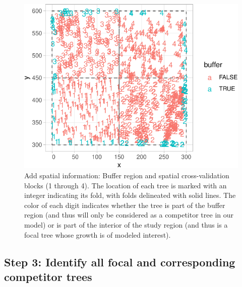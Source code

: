 \documentclass[12pt]{article}
\newenvironment{Shaded}{\begin{snugshade}}{\end{snugshade}}
\newcommand{\DataTypeTok}[1]{\textcolor[rgb]{0.13,0.29,0.53}{#1}}
\newcommand{\DecValTok}[1]{\textcolor[rgb]{0.00,0.00,0.81}{#1}}
\newcommand{\KeywordTok}[1]{\textcolor[rgb]{0.13,0.29,0.53}{\textbf{#1}}}
\newcommand{\NormalTok}[1]{#1}
\newcommand{\OperatorTok}[1]{\textcolor[rgb]{0.81,0.36,0.00}{\textbf{#1}}}
\newcommand{\StringTok}[1]{\textcolor[rgb]{0.31,0.60,0.02}{#1}}
\begin{document}
\begin{Shaded}
\end{Shaded}

\begin{figure}

{\centering \includegraphics[width=0.66\linewidth]{Figures/scbi-spatial-information-1} 

}

\caption{Add spatial information: Buffer region and spatial cross-validation blocks (1 through 4). The location of each tree is marked with an integer indicating its fold, with folds delineated with solid lines. The color of each digit indicates whether the tree is part of the buffer region (and thus will only be considered as a competitor tree in our model) or is part of the interior of the study region (and thus is a focal tree whose growth is of modeled interest).}\label{fig:scbi-spatial-information}
\end{figure}

\hypertarget{focal-vs-comp}{%
\subsection{Step 3: Identify all focal and corresponding competitor
trees}\label{focal-vs-comp}}
\end{document}
